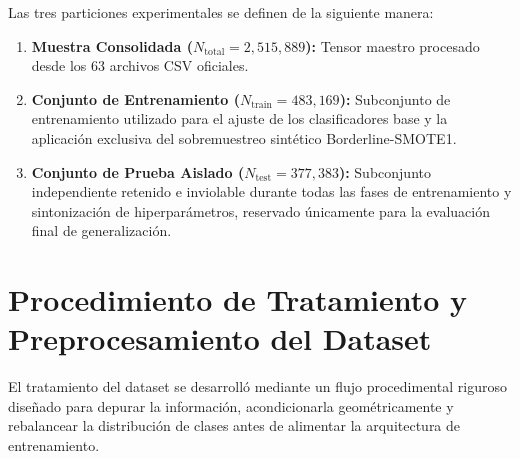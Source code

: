 Las tres particiones experimentales se definen de la siguiente manera:
\begin{enumerate}
    \item \textbf{Muestra Consolidada ($N_{\mathrm{total}} = 2,515,889$):} Tensor maestro procesado desde los 63 archivos CSV oficiales.
    \item \textbf{Conjunto de Entrenamiento ($N_{\mathrm{train}} = 483,169$):} Subconjunto de entrenamiento utilizado para el ajuste de los clasificadores base y la aplicación exclusiva del sobremuestreo sintético Borderline-SMOTE1.
    \item \textbf{Conjunto de Prueba Aislado ($N_{\mathrm{test}} = 377,383$):} Subconjunto independiente retenido e inviolable durante todas las fases de entrenamiento y sintonización de hiperparámetros, reservado únicamente para la evaluación final de generalización.
\end{enumerate}

\section{Procedimiento de Tratamiento y Preprocesamiento del Dataset}

El tratamiento del dataset se desarrolló mediante un flujo procedimental riguroso diseñado para depurar la información, acondicionarla geométricamente y rebalancear la distribución de clases antes de alimentar la arquitectura de entrenamiento.

